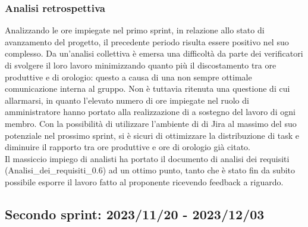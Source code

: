 \newpage
\subsubsection{Analisi retrospettiva}
Analizzando le ore impiegate nel primo sprint, in relazione allo stato di avanzamento del progetto, il precedente periodo risulta essere positivo nel suo complesso. Da un'analisi collettiva è emersa una difficoltà da parte dei verificatori di svolgere il loro lavoro minimizzando quanto più il discostamento tra ore produttive e di orologio: questo a causa di una non sempre ottimale comunicazione interna al gruppo. Non è tuttavia ritenuta una questione di cui allarmarsi, in quanto l'elevato numero di ore impiegate nel ruolo di amministratore hanno portato alla realizzazione di  a sostegno del lavoro di ogni membro. Con la possibilità di utilizzare l'ambiente di  di Jira al massimo del suo potenziale nel prossimo sprint, si è sicuri di ottimizzare la distribuzione di task e diminuire il rapporto tra ore produttive e ore di orologio già citato.\\
Il massiccio impiego di analisti ha portato il documento di analisi dei requisiti (Analisi\_dei\_requisiti\_0.6) ad un ottimo punto, tanto che è stato fin da subito possibile esporre il lavoro fatto al proponente ricevendo feedback a riguardo.
\newpage

\subsection{Secondo sprint: 2023/11/20 - 2023/12/03}

